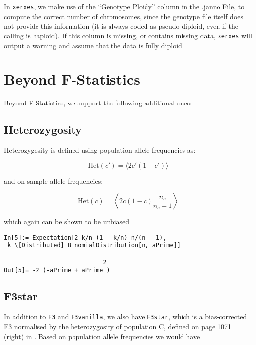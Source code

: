 \documentclass{article}
\begin{document}
In \texttt{xerxes}, we make use of the {``}Genotype$\_$Ploidy{''} column in the .janno File, to compute the correct number of chromosomes, since the genotype file itself does not provide this information (it is always coded as pseudo-diploid, even if the calling is haploid). If this column is missing, or contains missing data, \texttt{xerxes} will output a warning and assume that the data is fully diploid!

\section{Beyond F-Statistics}

Beyond F-Statistics, we support the following additional ones:

\subsection{Heterozygosity}

Heterozygosity is defined using population allele frequencies as:

\begin{equation}
\text{Het}(c')=\langle 2c'(1-c')\rangle
\end{equation}

and on sample allele frequencies:

\begin{equation}
\text{Het}(c)=\left\langle 2 c(1-c )\frac{n_c}{n_c-1}\right\rangle
\end{equation}

which again can be shown to be unbiased

\begin{lstlisting}
In[5]:= Expectation[2 k/n (1 - k/n) n/(n - 1),                                  
 k \[Distributed] BinomialDistribution[n, aPrime]]                              

                            2
Out[5]= -2 (-aPrime + aPrime )
\end{lstlisting}

\subsection{F3star}

In addition to \texttt{F3} and \texttt{F3vanilla}, we also have \texttt{F3star}, which is a bias-corrected F3 normalised by the heterozygosity of population C, defined on page 1071 (right) in \cite{Patterson2012-yq}. Based on population allele frequencies we would have
\end{document}
